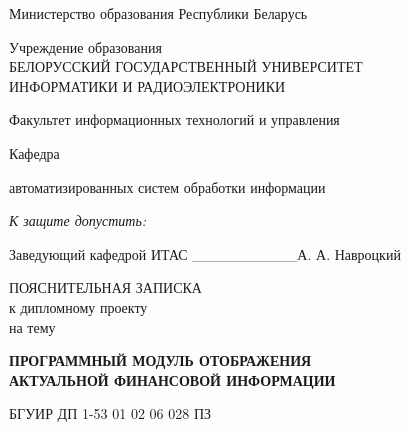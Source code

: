 \thispagestyle{empty}
\setlength{\parindent}{0ex} %

{\centering{}
  Министерство образования Республики Беларусь\par
}

\bigskip
{\centering{}
  Учреждение образования \\
  БЕЛОРУССКИЙ ГОСУДАРСТВЕННЫЙ УНИВЕРСИТЕТ \\
  ИНФОРМАТИКИ И РАДИОЭЛЕКТРОНИКИ
  \par
}

\bigskip
Факультет информационных технологий и управления

\smallskip
\parbox{\widthof{Факультет}}{Кафедра}
автоматизированных систем обработки информации

\vspace{\baselineskip}
\hfill
\begin{minipage}{.4\textwidth}
  {\raggedright{}
    \textit{К защите допустить:}

    \smallskip
    Заведующий кафедрой ИТАС
    \_\_\_\_\_\_\_\_\_\_А. А. Навроцкий\par
  }
\end{minipage}

\vspace{3\baselineskip}

{\centering{}
  ПОЯСНИТЕЛЬНАЯ ЗАПИСКА \\
  к дипломному проекту \\
  на тему\par
}

\bigskip
{\centering{}
  \textbf{ПРОГРАММНЫЙ МОДУЛЬ ОТОБРАЖЕНИЯ \\ АКТУАЛЬНОЙ ФИНАНСОВОЙ ИНФОРМАЦИИ}\par
}

\bigskip
{\centering{}
  БГУИР ДП 1-53 01 02 06 028 ПЗ \par
}

\vspace{4\baselineskip}

